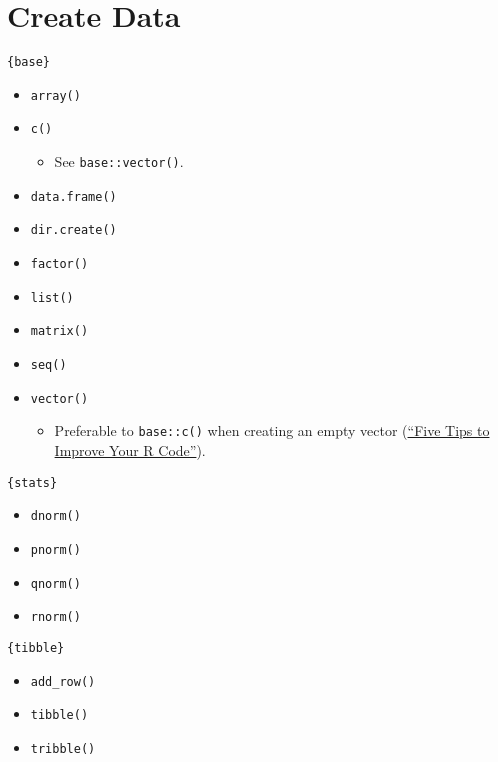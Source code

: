 \documentclass[
]{book}
\providecommand{\tightlist}{%
  \setlength{\itemsep}{0pt}\setlength{\parskip}{0pt}}
\begin{document}
\hypertarget{create-data}{%
\section{Create Data}\label{create-data}}

\texttt{\{base\}}

\begin{itemize}
\tightlist
\item
  \texttt{array()}
\item
  \texttt{c()}

  \begin{itemize}
  \tightlist
  \item
    See \texttt{base::vector()}.
  \end{itemize}
\item
  \texttt{data.frame()}
\item
  \texttt{dir.create()}
\item
  \texttt{factor()}
\item
  \texttt{list()}
\item
  \texttt{matrix()}
\item
  \texttt{seq()}
\item
  \texttt{vector()}

  \begin{itemize}
  \tightlist
  \item
    Preferable to \texttt{base::c()} when creating an empty vector (\href{https://www.datacamp.com/community/tutorials/five-tips-r-code-improve}{``Five Tips to Improve Your R Code''}).
  \end{itemize}
\end{itemize}

\texttt{\{stats\}}

\begin{itemize}
\tightlist
\item
  \texttt{dnorm()}
\item
  \texttt{pnorm()}
\item
  \texttt{qnorm()}
\item
  \texttt{rnorm()}
\end{itemize}

\texttt{\{tibble\}}

\begin{itemize}
\tightlist
\item
  \texttt{add\_row()}
\item
  \texttt{tibble()}
\item
  \texttt{tribble()}
\end{itemize}
\end{document}
